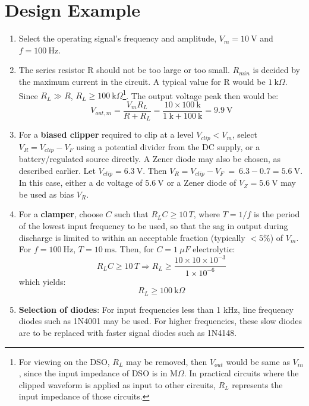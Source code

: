 \section{Design Example}
\begin{enumerate}[label=(\alph*)]
	\item Select the operating signal's frequency and amplitude, $V_m = 10\ \text{V}$ and $f = 100\ \text{Hz}$. 
	\item The series resistor R should not be too large or too small. $R_{min}$ is decided by the maximum current in the circuit. A typical value for R would be $1\ \text{k}\Omega$. Since $R_L\gg R$, $R_L \geq 100\ \text{k}\Omega$\footnote{For viewing on the DSO, $R_L$ may be removed, then $V_{out}$ would be same as $V_{in}$, since the input impedance of DSO is in $\text{M}\Omega$.  In practical circuits where the clipped waveform is applied as input to other circuits, $R_L$ represents the input impedance of those circuits.}. The output voltage peak then would be:
	\[
	V_{out,m}=\frac{V_mR_L}{R+R_L} = \frac{10\times 100\ \text{k}}{1\ \text{k}+100\ \text{k}} = 9.9 \ \text{V}
	\]
	 
	\item For a \textbf{biased clipper} required to clip at a level $V_{clip}<V_m$, select $V_R = V_{clip} - V_F$ using a potential divider from the DC supply, or a battery/regulated source directly. A Zener diode may also be chosen, as described earlier. Let $V_{clip} = 6.3\ \text{V}$. Then $V_R = V_{clip} - V_F\ =\ 6.3-0.7 = 5.6\ \text{V}$. In this case, either a dc voltage of $5.6\ \text{V}$ or a Zener diode of $V_Z=5.6\ \text{V}$ may be used as bias $V_R$.
	\item For a \textbf{clamper}, choose $C$ such that $R_L C \geq 10\,T$, where $T = 1/f$ is the period of the lowest input frequency to be used, so that the sag in output during discharge is limited to within an acceptable fraction (typically $< 5\%$) of $V_m$. For $f=100\ \text{Hz}$, $T=10\ \text{ms}$. Then, for $C = 1\ \mu F$ electrolytic:
	\[
	R_L C \geq 10\,T \Rightarrow R_L \geq \frac{10\times 10\times 10^{-3}}{1\times 10^{-6}}
	\]
	which yields:
	\[
	R_L\geq 100\ \text{k}\Omega
	\]
	\item \textbf{Selection of diodes}: For input frequencies less than 1 kHz, line frequency diodes such as 1N4001 may be used. For higher frequencies, these slow diodes are to be replaced with faster signal diodes such as 1N4148.
\end{enumerate}
